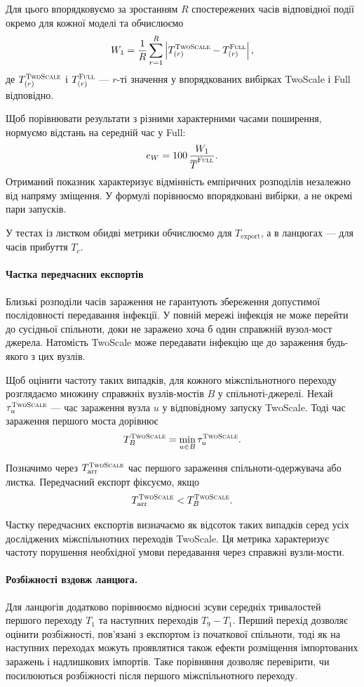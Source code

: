 \documentclass[a4paper,fleqn]{cas-sc}
\newcommand{\Full}{\textup{\textsc{Full}}}
\newcommand{\TS}{\textup{\textsc{TwoScale}}}
\newcommand{\eW}{e_{W}}
\begin{document}
Для цього впорядковуємо за зростанням
$R$ спостережених часів відповідної події
окремо для кожної моделі та обчислюємо
\[
W_1 =
\frac{1}{R}
\sum_{r=1}^{R}
\left|
T_{(r)}^{\TS}-T_{(r)}^{\Full}
\right|,
\]
де $T_{(r)}^{\TS}$ і $T_{(r)}^{\Full}$ ---
$r$-ті значення у впорядкованих вибірках
TwoScale і Full відповідно.

Щоб порівнювати результати з різними
характерними часами поширення,
нормуємо відстань на середній час у Full:
\[
\eW =
100\,\frac{W_1}{\overline{T}^{\Full}}.
\]
Отриманий показник характеризує
відмінність емпіричних розподілів
незалежно від напряму зміщення.
У формулі порівнюємо впорядковані
вибірки, а не окремі пари запусків.

У тестах із листком обидві метрики
обчислюємо для $T_{\mathrm{export}}$,
а в ланцюгах --- для часів прибуття $T_c$.

\paragraph{Частка передчасних експортів}
Близькі розподіли часів зараження
не гарантують збереження допустимої
послідовності передавання інфекції.
У повній мережі інфекція не може перейти
до сусідньої спільноти, доки не заражено
хоча б один справжній вузол-мост джерела.
Натомість TwoScale може передавати інфекцію
ще до зараження будь-якого з цих вузлів.


Щоб оцінити частоту таких випадків,
для кожного міжспільнотного переходу
розглядаємо множину справжніх вузлів-мостів
$B$ у спільноті-джерелі.
Нехай $\tau_u^{\TS}$ --- час зараження вузла $u$
у відповідному запуску TwoScale.
Тоді час зараження першого моста дорівнює
\[
T_B^{\TS}=\min_{u\in B}\tau_u^{\TS}.
\]

Позначимо через $T_{\mathrm{arr}}^{\TS}$
час першого зараження спільноти-одержувача
або листка. Передчасний експорт фіксуємо,
якщо
\[
T_{\mathrm{arr}}^{\TS}<T_B^{\TS}.
\]

Частку передчасних експортів визначаємо
як відсоток таких випадків серед усіх
досліджених міжспільнотних переходів TwoScale.
Ця метрика характеризує частоту порушення
необхідної умови передавання через
справжні вузли-мости.



\paragraph{Розбіжності вздовж ланцюга.}
Для ланцюгів додатково порівнюємо відносні
зсуви середніх тривалостей першого переходу
$T_1$ та наступних переходів $T_9-T_1$.
Перший перехід дозволяє оцінити розбіжності,
пов'язані з експортом із початкової спільноти,
тоді як на наступних переходах можуть
проявлятися також ефекти розміщення
імпортованих заражень і надлишкових імпортів.
Таке порівняння дозволяє перевірити,
чи посилюються розбіжності після першого
міжспільнотного переходу.
\end{document}
